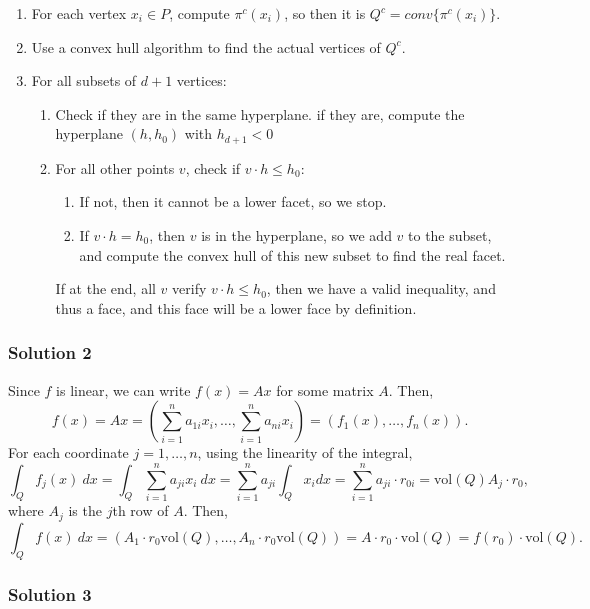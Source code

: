 \documentclass[12pt,a4paper]{article}
\begin{document}
\begin{enumerate}
	\item For each vertex $x_i \in P$, compute $\pi^c(x_i)$, so then it is $Q^c = conv\{\pi^c(x_i)\}$.
	
	\item Use a convex hull algorithm to find the actual vertices of $Q^c$.
	
	\item For all subsets of $d+1$ vertices:
	\begin{enumerate}
		\item Check if they are in the same hyperplane.
		if they are, compute the hyperplane $(h,h_0)$ with $h_{d+1} < 0$
		
		\item For all other points $v$, check if $v \cdot h \leq h_0$:
		\begin{enumerate}
			\item If not, then it cannot be a lower facet, so we stop.
			\item If $v \cdot h = h_0$, then $v$ is in the hyperplane, so we add $v$ to the subset, and compute the convex hull of this new subset to find the real facet.
		\end{enumerate}
		If at the end, all $v$ verify $v \cdot h \leq h_0$, then we have a valid inequality, and thus a face, and this face will be a lower face by definition.
				
	\end{enumerate}
		
\end{enumerate}



\subsubsection*{Solution 2}
Since $f$ is linear, we can write $f(x)=Ax$ for some matrix $A$. Then,
\[ f(x) = Ax = \left( \sum_{i=1}^{n} a_{1i}x_i, \dots, \sum_{i=1}^{n} a_{ni}x_i \right) = (f_1(x), \dots, f_n(x)). \]
For each coordinate $j=1,\dots,n$, using the linearity of the integral, 
\[ \int_{Q}^{} f_j(x) \ dx = \int_{Q} \sum_{i=1}^{n} a_{ji}x_i \ dx = \sum_{i=1}^{n} a_{ji} \int_{Q} x_i dx = \sum_{i=1}^{n} a_{ji} \cdot r_{0i} = \text{vol}(Q)  A_j \cdot r_0, \]
where $A_j$  is the $j$th row of $A$. Then, 
\[ \int_{Q}^{} f(x) \ dx = (A_1\cdot r_0 \text{vol}(Q), \dots, A_n\cdot r_0 \text{vol}(Q)) = A \cdot r_0 \cdot \text{vol}(Q) = f(r_0) \cdot \text{vol}(Q). \]
\subsubsection*{Solution 3}
\end{document}
